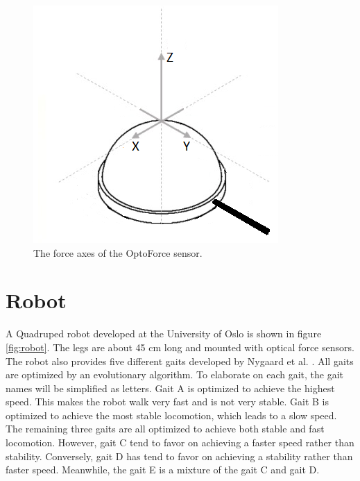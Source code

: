 \documentclass[USenglish]{ifimaster}  %
\begin{document}
\begin{figure}[h]
	\centering
	\includegraphics[scale=0.8]{Figures/OptoforceAxis32}
	\caption[The force axes of the OptoForce sensor]{The force axes of the OptoForce sensor.}
	\label{fig:OptoforceAxis}
\end{figure}

\section{Robot} \label{sec:robot}
A Quadruped robot developed at the University of Oslo is shown in figure \ref{fig:robot}. The legs are about 45 cm long and mounted with optical force sensors. The robot also provides five different gaits developed by Nygaard et al. \cite{7850167}. All gaits are optimized by an evolutionary algorithm. To elaborate on each gait, the gait names will be simplified as letters. Gait A is optimized to achieve the highest speed. This makes the robot walk very fast and is not very stable. Gait B is optimized to achieve the most stable locomotion, which leads to a slow speed. The remaining three gaits are all optimized to achieve both stable and fast locomotion. However, gait C tend to favor on achieving a faster speed rather than stability. Conversely, gait D has tend to favor on achieving a stability rather than faster speed. Meanwhile, the gait E is a mixture of the gait C and gait D.
\end{document}
